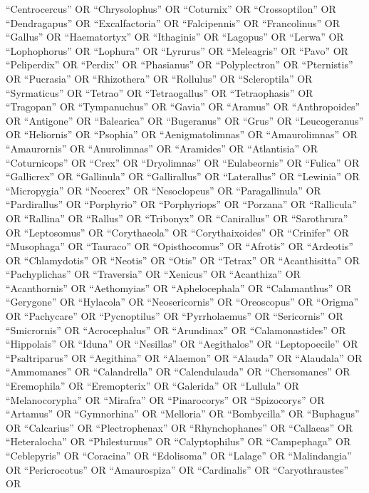\documentclass[
  number,
  review,
  onecolumn]{elsarticle}
\begin{document}
``Centrocercus'' OR ``Chrysolophus'' OR ``Coturnix'' OR ``Crossoptilon''
OR ``Dendragapus'' OR ``Excalfactoria'' OR ``Falcipennis'' OR
``Francolinus'' OR ``Gallus'' OR ``Haematortyx'' OR ``Ithaginis'' OR
``Lagopus'' OR ``Lerwa'' OR ``Lophophorus'' OR ``Lophura'' OR
``Lyrurus'' OR ``Meleagris'' OR ``Pavo'' OR ``Peliperdix'' OR ``Perdix''
OR ``Phasianus'' OR ``Polyplectron'' OR ``Pternistis'' OR ``Pucrasia''
OR ``Rhizothera'' OR ``Rollulus'' OR ``Scleroptila'' OR ``Syrmaticus''
OR ``Tetrao'' OR ``Tetraogallus'' OR ``Tetraophasis'' OR ``Tragopan'' OR
``Tympanuchus'' OR ``Gavia'' OR ``Aramus'' OR ``Anthropoides'' OR
``Antigone'' OR ``Balearica'' OR ``Bugeranus'' OR ``Grus'' OR
``Leucogeranus'' OR ``Heliornis'' OR ``Psophia'' OR ``Aenigmatolimnas''
OR ``Amaurolimnas'' OR ``Amaurornis'' OR ``Anurolimnas'' OR ``Aramides''
OR ``Atlantisia'' OR ``Coturnicops'' OR ``Crex'' OR ``Dryolimnas'' OR
``Eulabeornis'' OR ``Fulica'' OR ``Gallicrex'' OR ``Gallinula'' OR
``Gallirallus'' OR ``Laterallus'' OR ``Lewinia'' OR ``Micropygia'' OR
``Neocrex'' OR ``Nesoclopeus'' OR ``Paragallinula'' OR ``Pardirallus''
OR ``Porphyrio'' OR ``Porphyriops'' OR ``Porzana'' OR ``Rallicula'' OR
``Rallina'' OR ``Rallus'' OR ``Tribonyx'' OR ``Canirallus'' OR
``Sarothrura'' OR ``Leptosomus'' OR ``Corythaeola'' OR
``Corythaixoides'' OR ``Crinifer'' OR ``Musophaga'' OR ``Tauraco'' OR
``Opisthocomus'' OR ``Afrotis'' OR ``Ardeotis'' OR ``Chlamydotis'' OR
``Neotis'' OR ``Otis'' OR ``Tetrax'' OR ``Acanthisitta'' OR
``Pachyplichas'' OR ``Traversia'' OR ``Xenicus'' OR ``Acanthiza'' OR
``Acanthornis'' OR ``Aethomyias'' OR ``Aphelocephala'' OR
``Calamanthus'' OR ``Gerygone'' OR ``Hylacola'' OR ``Neosericornis'' OR
``Oreoscopus'' OR ``Origma'' OR ``Pachycare'' OR ``Pycnoptilus'' OR
``Pyrrholaemus'' OR ``Sericornis'' OR ``Smicrornis'' OR ``Acrocephalus''
OR ``Arundinax'' OR ``Calamonastides'' OR ``Hippolais'' OR ``Iduna'' OR
``Nesillas'' OR ``Aegithalos'' OR ``Leptopoecile'' OR ``Psaltriparus''
OR ``Aegithina'' OR ``Alaemon'' OR ``Alauda'' OR ``Alaudala'' OR
``Ammomanes'' OR ``Calandrella'' OR ``Calendulauda'' OR ``Chersomanes''
OR ``Eremophila'' OR ``Eremopterix'' OR ``Galerida'' OR ``Lullula'' OR
``Melanocorypha'' OR ``Mirafra'' OR ``Pinarocorys'' OR ``Spizocorys'' OR
``Artamus'' OR ``Gymnorhina'' OR ``Melloria'' OR ``Bombycilla'' OR
``Buphagus'' OR ``Calcarius'' OR ``Plectrophenax'' OR ``Rhynchophanes''
OR ``Callaeas'' OR ``Heteralocha'' OR ``Philesturnus'' OR
``Calyptophilus'' OR ``Campephaga'' OR ``Ceblepyris'' OR ``Coracina'' OR
``Edolisoma'' OR ``Lalage'' OR ``Malindangia'' OR ``Pericrocotus'' OR
``Amaurospiza'' OR ``Cardinalis'' OR ``Caryothraustes'' OR
\end{document}
